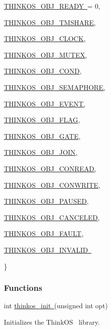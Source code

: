 {{\protect\hyperlink{h.1ljsd9k}{THINKOS\_OBJ\_READY}}{\protect\hyperlink{h.1ljsd9k}{~}}{=
0, }

{\protect\hyperlink{h.45jfvxd}{THINKOS\_OBJ\_TMSHARE}}{\protect\hyperlink{h.45jfvxd}{,}}{~}

{\protect\hyperlink{h.2koq656}{THINKOS\_OBJ\_CLOCK}}{\protect\hyperlink{h.2koq656}{,}}{~}

{\protect\hyperlink{h.zu0gcz}{THINKOS\_OBJ\_MUTEX}}{\protect\hyperlink{h.zu0gcz}{,}}{~}

{\protect\hyperlink{h.3jtnz0s}{THINKOS\_OBJ\_COND}}{\protect\hyperlink{h.3jtnz0s}{,}}{~}

{\protect\hyperlink{h.1yyy98l}{THINKOS\_OBJ\_SEMAPHORE}}{\protect\hyperlink{h.1yyy98l}{,}}{~}

{\protect\hyperlink{h.4iylrwe}{THINKOS\_OBJ\_EVENT}}{\protect\hyperlink{h.4iylrwe}{,}}{~}

{\protect\hyperlink{h.2y3w247}{THINKOS\_OBJ\_FLAG}}{\protect\hyperlink{h.2y3w247}{,}}{~}

{\protect\hyperlink{h.1d96cc0}{THINKOS\_OBJ\_GATE}}{\protect\hyperlink{h.1d96cc0}{,}}{~}

{\protect\hyperlink{h.3x8tuzt}{THINKOS\_OBJ\_JOIN}}{\protect\hyperlink{h.3x8tuzt}{,}}{~}

{\protect\hyperlink{h.2ce457m}{THINKOS\_OBJ\_CONREAD}}{\protect\hyperlink{h.2ce457m}{,}}{~}

{\protect\hyperlink{h.rjefff}{THINKOS\_OBJ\_CONWRITE}}{\protect\hyperlink{h.rjefff}{,}}{~}

{\protect\hyperlink{h.3bj1y38}{THINKOS\_OBJ\_PAUSED}}{\protect\hyperlink{h.3bj1y38}{,}}{~}

{\protect\hyperlink{h.1qoc8b1}{THINKOS\_OBJ\_CANCELED}}{\protect\hyperlink{h.1qoc8b1}{,}}{~}

{\protect\hyperlink{h.4anzqyu}{THINKOS\_OBJ\_FAULT}}{\protect\hyperlink{h.4anzqyu}{,}}{~}

{\protect\hyperlink{h.2pta16n}{THINKOS\_OBJ\_INVALID}}{\protect\hyperlink{h.2pta16n}{~}}

{\}}

\subsubsection{\texorpdfstring{{Functions}}{Functions}}\label{functions}

{int
}{\protect\hyperlink{h.14ykbeg}{thinkos\_init}}{\protect\hyperlink{h.14ykbeg}{~}}{(unsigned
int opt)}

{Initializes the }{ThinkOS}{~ library. }

}
